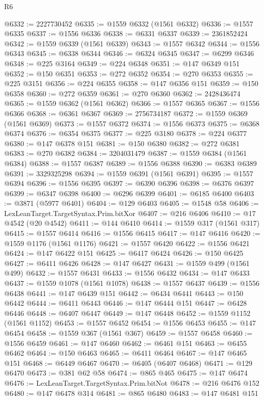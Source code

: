 \begin{lexlean}{R6}
\begin{coremodule}
@6332 := 2227730452
@6335 := @1559 @6332 (@1561 @6332)
@6336 := @1557 @6335
@6337 := @1556 @6336
@6338 := @6331 @6337
@6339 := 2361852424
@6342 := @1559 @6339 (@1561 @6339)
@6343 := @1557 @6342
@6344 := @1556 @6343
@6345 := @6338 @6344
@6346 := @6324 @6345
@6347 := @6299 @6346
@6348 := @225 @3164
@6349 := @224 @6348
@6351 := @147 @6349 @151
@6352 := @150 @6351
@6353 := @272 @6352
@6354 := @270 @6353
@6355 := @225 @3151
@6356 := @224 @6355
@6358 := @147 @6356 @151
@6359 := @150 @6358
@6360 := @272 @6359
@6361 := @270 @6360
@6362 := 2428436474
@6365 := @1559 @6362 (@1561 @6362)
@6366 := @1557 @6365
@6367 := @1556 @6366
@6368 := @6361 @6367
@6369 := 2756734187
@6372 := @1559 @6369 (@1561 @6369)
@6373 := @1557 @6372
@6374 := @1556 @6373
@6375 := @6368 @6374
@6376 := @6354 @6375
@6377 := @225 @3180
@6378 := @224 @6377
@6380 := @147 @6378 @151
@6381 := @150 @6380
@6382 := @272 @6381
@6383 := @270 @6382
@6384 := 3204031479
@6387 := @1559 @6384 (@1561 @6384)
@6388 := @1557 @6387
@6389 := @1556 @6388
@6390 := @6383 @6389
@6391 := 3329325298
@6394 := @1559 @6391 (@1561 @6391)
@6395 := @1557 @6394
@6396 := @1556 @6395
@6397 := @6390 @6396
@6398 := @6376 @6397
@6399 := @6347 @6398
@6400 := @6296 @6399
@6401 := @6185 @6400
@6403 := @3871 (@5977 @6401)
@6404 := @129 @6403
@6405 := @1548 @58
@6406 := LexLeanTarget.TargetSyntax.Prim.bitXor
@6407 := @216 @6406
@6410 := @17 @4542 (@20 @4542)
@6411 := @144 @6410
@6414 := @1559 @317 (@1561 @317)
@6415 := @1557 @6414
@6416 := @1556 @6415
@6417 := @147 @6416
@6420 := @1559 @1176 (@1561 @1176)
@6421 := @1557 @6420
@6422 := @1556 @6421
@6424 := @147 @6422 @151
@6425 := @6417 @6424
@6426 := @150 @6425
@6427 := @6411 @6426
@6428 := @147 @6427
@6431 := @1559 @499 (@1561 @499)
@6432 := @1557 @6431
@6433 := @1556 @6432
@6434 := @147 @6433
@6437 := @1559 @1078 (@1561 @1078)
@6438 := @1557 @6437
@6439 := @1556 @6438
@6441 := @147 @6439 @151
@6442 := @6434 @6441
@6443 := @150 @6442
@6444 := @6411 @6443
@6446 := @147 @6444 @151
@6447 := @6428 @6446
@6448 := @6407 @6447
@6449 := @147 @6448
@6452 := @1559 @1152 (@1561 @1152)
@6453 := @1557 @6452
@6454 := @1556 @6453
@6455 := @147 @6454
@6458 := @1559 @367 (@1561 @367)
@6459 := @1557 @6458
@6460 := @1556 @6459
@6461 := @147 @6460
@6462 := @6461 @151
@6463 := @6455 @6462
@6464 := @150 @6463
@6465 := @6411 @6464
@6467 := @147 @6465 @151
@6468 := @6449 @6467
@6470 := @6405 (@6407 @6468)
@6471 := @129 @6470
@6473 := @381 @62 @58
@6474 := @865 @465
@6475 := @147 @6474
@6476 := LexLeanTarget.TargetSyntax.Prim.bitNot
@6478 := @216 @6476 @152
@6480 := @147 @6478 @314
@6481 := @865 @6480
@6483 := @147 @6481 @151

\end{coremodule}
\end{lexlean}
